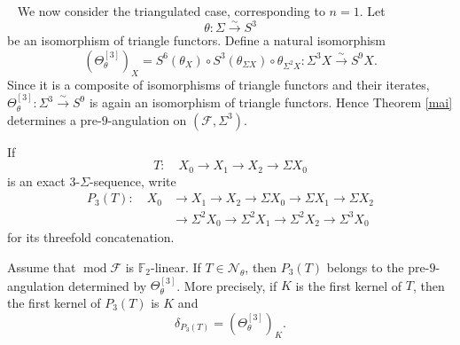 \documentclass[12pt, twoside]{article}
\numberwithin{equation}{section}
\begin{document}
\hspace{-5mm}{\bf 2.2~ The third power of a complete comparison.}~
We now consider the triangulated case, corresponding to $n=1$. Let
\[
\theta\colon \Sigma\xrightarrow{\sim}S^3
\]
be an isomorphism of triangle functors. Define a natural isomorphism
\begin{equation}\label{eq:third-power}
(\Theta_\theta^{[3]})_X
=S^6(\theta_X)\circ S^3(\theta_{\Sigma X})\circ\theta_{\Sigma^2X}\colon
\Sigma^3X\xrightarrow{\sim}S^9X.
\end{equation}
Since it is a composite of isomorphisms of triangle functors and their iterates, $\Theta_\theta^{[3]}\colon\Sigma^3\xrightarrow{\sim}S^9$ is again an isomorphism of triangle functors. Hence Theorem \ref{mai} determines a pre-$9$-angulation on $(\mathcal F,\Sigma^3)$.

If
\[
T:\quad X_0\longrightarrow X_1\longrightarrow X_2\longrightarrow\Sigma X_0
\]
is an exact $3$-$\Sigma$-sequence, write
\begin{equation*}
\begin{split}
P_3(T):\quad
X_0&\longrightarrow X_1\longrightarrow X_2\longrightarrow\Sigma X_0
\longrightarrow\Sigma X_1\longrightarrow\Sigma X_2\\
&\longrightarrow\Sigma^2X_0\longrightarrow\Sigma^2X_1\longrightarrow\Sigma^2X_2
\longrightarrow\Sigma^3X_0
\end{split}
\end{equation*}
for its threefold concatenation.

\begin{lemma}\label{lem:concatenation}
Assume that $\operatorname{mod}\mathcal F$ is $\mathbb F_2$-linear. If $T\in\mathcal N_\theta$, then $P_3(T)$ belongs to the pre-$9$-angulation determined by $\Theta_\theta^{[3]}$. More precisely, if $K$ is the first kernel of $T$, then the first kernel of $P_3(T)$ is $K$ and
\[
\delta_{P_3(T)}=(\Theta_\theta^{[3]})_K.
\]
\end{lemma}
\end{document}
